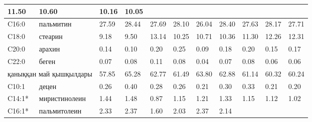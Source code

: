 \begin{table}[]
{\begin{tabular}{|ll|lll|lll|lll|}
    11.50 &
    \multicolumn{1}{l|}{10.60} &
    \multicolumn{1}{l|}{10.16} &
    10.05 \\ \hline
  \multicolumn{1}{|l|}{C16:0} &
    пальмитин &
    \multicolumn{1}{l|}{27.59} &
    \multicolumn{1}{l|}{28.44} &
    27.69 &
    \multicolumn{1}{l|}{28.10} &
    \multicolumn{1}{l|}{26.04} &
    28.40 &
    \multicolumn{1}{l|}{27.63} &
    \multicolumn{1}{l|}{28.17} &
    27.71 \\ \hline
  \multicolumn{1}{|l|}{C18:0} &
    стеарин &
    \multicolumn{1}{l|}{9.18} &
    \multicolumn{1}{l|}{9.50} &
    13.14 &
    \multicolumn{1}{l|}{10.25} &
    \multicolumn{1}{l|}{10.71} &
    10.36 &
    \multicolumn{1}{l|}{11.30} &
    \multicolumn{1}{l|}{12.26} &
    12.31 \\ \hline
  \multicolumn{1}{|l|}{C20:0} &
    арахин &
    \multicolumn{1}{l|}{0.14} &
    \multicolumn{1}{l|}{0.10} &
    0.20 &
    \multicolumn{1}{l|}{0.25} &
    \multicolumn{1}{l|}{0.09} &
    0.18 &
    \multicolumn{1}{l|}{0.20} &
    \multicolumn{1}{l|}{0.15} &
    0.17 \\ \hline
  \multicolumn{1}{|l|}{C22:0} &
    беген &
    \multicolumn{1}{l|}{0.07} &
    \multicolumn{1}{l|}{0.08} &
    0.11 &
    \multicolumn{1}{l|}{0.08} &
    \multicolumn{1}{l|}{0.04} &
    0.07 &
    \multicolumn{1}{l|}{0.08} &
    \multicolumn{1}{l|}{0.06} &
    0.06 \\ \hline
  \multicolumn{2}{|l|}{қаныққан май қышқылдары} &
    \multicolumn{1}{l|}{57.85} &
    \multicolumn{1}{l|}{65.28} &
    62.77 &
    \multicolumn{1}{l|}{61.49} &
    \multicolumn{1}{l|}{63.80} &
    62.88 &
    \multicolumn{1}{l|}{61.14} &
    \multicolumn{1}{l|}{60.32} &
    60.24 \\ \hline
  \multicolumn{1}{|l|}{C10:1} &
    децен &
    \multicolumn{1}{l|}{0.26} &
    \multicolumn{1}{l|}{0.40} &
    0.28 &
    \multicolumn{1}{l|}{0.26} &
    \multicolumn{1}{l|}{0.21} &
    0.30 &
    \multicolumn{1}{l|}{0.33} &
    \multicolumn{1}{l|}{0.21} &
    0.20 \\ \hline
  \multicolumn{1}{|l|}{C14:1*} &
    миристинолеин &
    \multicolumn{1}{l|}{1.44} &
    \multicolumn{1}{l|}{1.48} &
    0.87 &
    \multicolumn{1}{l|}{1.15} &
    \multicolumn{1}{l|}{1.21} &
    1.33 &
    \multicolumn{1}{l|}{1.15} &
    \multicolumn{1}{l|}{1.12} &
    1.02 \\ \hline
  \multicolumn{1}{|l|}{C16:1*} &
    пальмитолеин &
    \multicolumn{1}{l|}{2.33} &
    \multicolumn{1}{l|}{2.37} &
    1.60 &
    \multicolumn{1}{l|}{2.03} &
    \multicolumn{1}{l|}{2.37} &
    2.14 &

\end{tabular}}
\end{table}
